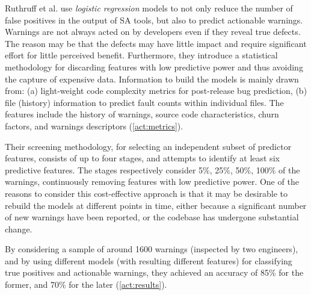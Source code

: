  Ruthruff et al. \cite{actionable_sa} use \textit{logistic regression} models to not only reduce the number of false positives in the output of SA tools, but also to predict actionable warnings. Warnings are not always acted on by developers even if they reveal true defects. The reason may be that the defects may have little impact and require significant effort for little perceived benefit. Furthermore, they introduce a statistical methodology for discarding features with low predictive power and thus avoiding the capture of expensive data. Information to build the models is mainly drawn from: (a) light-weight code complexity metrics for post-release bug prediction, (b) file (history) information to predict fault counts within individual files. The features include the history of warnings, source code characteristics, churn factors, and warnings descriptors (\cref{act:metrics}).

 Their screening methodology, for selecting an independent subset of predictor features, consists of up to four stages, and attempts to identify at least six predictive features. The stages respectively consider 5\%, 25\%, 50\%, 100\% of the warnings, continuously removing features with low predictive power. One of the reasons to consider this cost-effective approach is that it may be desirable to rebuild the models at different points in time, either because a significant number of new warnings have been reported, or the codebase has undergone substantial change.

 By considering a sample of around 1600 warnings (inspected by two engineers), and by using different models (with resulting different features) for classifying true positives and actionable warnings, they achieved an accuracy of 85\% for the former, and 70\% for the later (\cref{act:results}).

